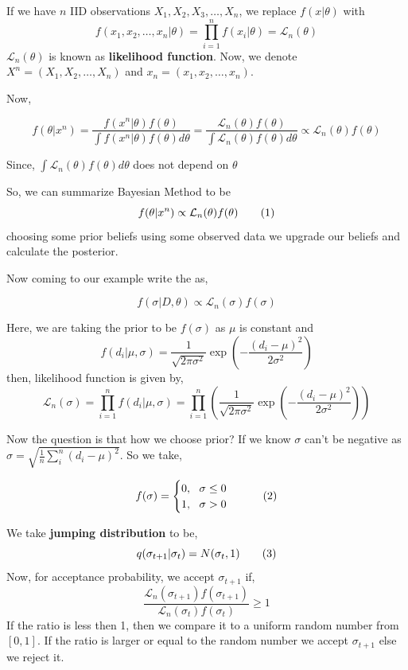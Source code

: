 \begin{example}
    If we have $ n $ IID observations $ X_1,X_2,X_3,\ldots,X_n $, we replace $ f(x|\theta) $ with 
    \[
        f(x_1,x_2,\ldots,x_n|\theta) = \prod_{i=1}^{n} f(x_i|\theta) = \mathcal{L}_n(\theta)
    \]
    $ \mathcal{L}_n(\theta) $ is known as \textbf{likelihood function}. Now, we denote $ X^{n} = (X_1,X_2,\ldots,X_n) $ and $ x_n = (x_1,x_2,\ldots,x_n) $. 

    Now, 

    \begin{equation}
        f(\theta|x^{n} ) = \frac{f(x^{n}|\theta)f(\theta) }{\int f(x^{n}|\theta)f(\theta)d \theta } = \frac{\mathcal{L}_n(\theta)f(\theta)}{\int \mathcal{L}_n(\theta) f(\theta)d \theta} \propto \mathcal{L}_n(\theta)f(\theta)
    \end{equation}
    
    Since, $ \int \mathcal{L}_n(\theta)f(\theta)d \theta  $ does not depend on $ \theta $

    So, we can summarize Bayesian Method to be
    \[
        f(\theta|x^{n} ) \propto \mathcal{L}_n(\theta)f(\theta) \label{eq:bayesian method} \numberthis
    \]
    choosing some prior beliefs using some observed data we upgrade our beliefs and calculate the posterior.

    Now coming to our example write the  as,

    \[
        f(\sigma|D,\theta) \propto \mathcal{L}_n(\sigma)f(\sigma)
    \]

    Here, we are taking the prior to be $ f(\sigma) $ as $ \mu $ is constant and 
    \[
        f(d_i|\mu,\sigma) = \frac{1}{\sqrt{2 \pi \sigma^2}} \exp \left( - \frac{(d_i -\mu )^2}{2 \sigma^2} \right)
    \]
    then, likelihood function is given by,
    \[
        \mathcal{L}_n(\sigma) = \prod_{i=1}^{n} f(d_i|\mu,\sigma) = \prod_{i=1}^{n} \left( \frac{1}{\sqrt{2 \pi \sigma^2}} \exp \left( - \frac{(d_i -\mu )^2}{2 \sigma^2} \right) \right)
    \]

    Now the question is that how we choose prior? If we know $ \sigma $ can't be negative as $ \sigma = \sqrt{ \frac{1}{n} \sum_{i}^{n} (d_i - \mu)^2 } $. So we take,

    \[
        f(\sigma) = 
        \begin{cases}
            0, \ \ \sigma \le 0 \\
            1, \ \ \sigma > 0
        \end{cases} \numberthis \label{eq:prior}
    \]

    We take \textbf{jumping distribution}  to be,
    \[
        q(\sigma_{t+1}|\sigma_{t}) = N(\sigma_t,1) \label{eq:jumping for mh example2} \numberthis
    \]
    Now, for acceptance probability,
    we accept $ \sigma_{t+1} $ if,
    \begin{equation}
        \label{eq:1st accept mh example2}
        \frac{\mathcal{L}_n(\sigma_{t+1})f(\sigma_{t+1})}{\mathcal{L}_n(\sigma_{t})f(\sigma_{t})} \ge 1
    \end{equation}
    If the ratio is less then 1, then we compare it to a uniform random number from $ [0,1] $. If the ratio is larger or equal to the random number we accept $ \sigma_{t+1} $ else we reject it.


\end{example}
